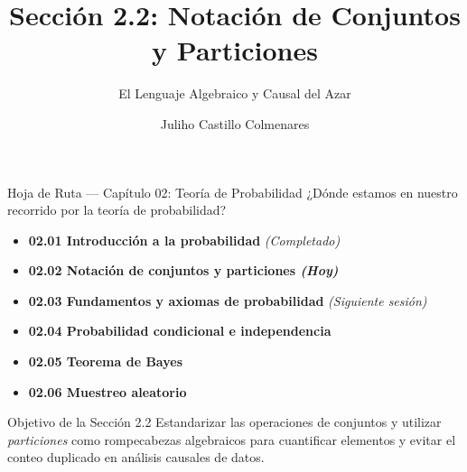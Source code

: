 


\title[Notación de Conjuntos]{Sección 2.2: Notación de Conjuntos y Particiones}
\subtitle{El Lenguaje Algebraico y Causal del Azar}
\author[J. Castillo Colmenares]{Juliho Castillo Colmenares}
\date{}



\begin{frame}[plain]
  \titlepage
\end{frame}

\begin{frame}{Hoja de Ruta — Capítulo 02: Teoría de Probabilidad}
  ¿Dónde estamos en nuestro recorrido por la teoría de probabilidad? \pause
  \begin{itemize}
    \item \textbf{02.01 Introducción a la probabilidad} \emph{(Completado)} \pause
    \item \color{TecRojo}\textbf{02.02 Notación de conjuntos y particiones \emph{(Hoy)}}\color{black} \pause
    \item \textbf{02.03 Fundamentos y axiomas de probabilidad} \emph{(Siguiente sesión)} \pause
    \item \textbf{02.04 Probabilidad condicional e independencia} \pause
    \item \textbf{02.05 Teorema de Bayes} \pause
    \item \textbf{02.06 Muestreo aleatorio}
  \end{itemize}
  \vspace{0.6em}
  \begin{block}{Objetivo de la Sección 2.2}
    Estandarizar las operaciones de conjuntos y utilizar \emph{particiones} como rompecabezas algebraicos para cuantificar elementos y evitar el conteo duplicado en análisis causales de datos.
  \end{block}
\end{frame}

